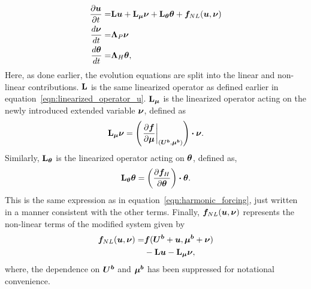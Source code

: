 \begin{subequations}
	\begin{align}
			\label{eqn:evolution_extended1}
			\frac{\partial \boldsymbol{u}}{\partial t} =& \mathbf{L}\boldsymbol{u} + \mathbf{L}_{\boldsymbol{\mu}}\boldsymbol{\nu} +\mathbf{L}_{\boldsymbol{\theta}}\boldsymbol{\theta} + \boldsymbol{f}_{NL}(\boldsymbol{u},\boldsymbol{\nu}) \\
			\label{eqn:evolution_extended2}
			\frac{d \boldsymbol{\nu}}{d t} = & \mathbf{\Lambda}_{P}\boldsymbol{\nu} \\
			\label{eqn:evolution_extended3}
			\frac{d \boldsymbol{\theta}}{d t} = &  \mathbf{\Lambda}_{H}\boldsymbol{\theta}, 
	\end{align}
	\label{eqn:evolution_extended}
\end{subequations}
Here, as done earlier, the evolution equations are split into the linear and non-linear contributions. $\mathbf{L}$ is the same linearized operator as defined earlier in equation~\ref{eqn:linearized_operator_u}. $\mathbf{L}_{\boldsymbol{\mu}}$ is the linearized operator acting on the newly introduced extended variable $\boldsymbol{\nu}$, defined as
\begin{equation}
	\mathbf{L}_{\boldsymbol{\mu}}\boldsymbol{\nu} = \left(\left.\frac{\partial \boldsymbol{f}}{\partial \boldsymbol{\mu}}\right|_{(\boldsymbol{U^{b}},\boldsymbol{\mu^{b}})} \right)\boldsymbol{\cdot} \boldsymbol{\nu}.
	\label{eqn:linearized_operator_mu}
\end{equation}
Similarly, $\mathbf{L}_{\boldsymbol{\theta}}$ is the linearized operator acting on $\boldsymbol{\theta}$, defined as,
\begin{equation}
	\mathbf{L}_{\boldsymbol{\theta}}\boldsymbol{\theta} = \left(\frac{\partial \boldsymbol{f}_{H}}{\partial \boldsymbol{\theta}} \right)\boldsymbol{\cdot} \boldsymbol{\theta}.
	\label{eqn:linearized_operator_theta}
\end{equation}
This is the same expression as in equation~\eqref{eqn:harmonic_forcing}, just written in a manner consistent with the other terms. Finally, $\boldsymbol{f}_{NL}(\boldsymbol{u},\boldsymbol{\nu})$ represents the non-linear terms of the modified system given by
\begin{equation}
	\begin{split}
		\boldsymbol{f}_{NL}(\boldsymbol{u},\boldsymbol{\nu}) =& \boldsymbol{f}(\boldsymbol{U^{b}} + \boldsymbol{u},\boldsymbol{\mu^{b}} + \boldsymbol{\nu}) \\
		& - \mathbf{L}\boldsymbol{u} - \mathbf{L}_{\boldsymbol{\mu}}\boldsymbol{\nu},
	\end{split}
	\label{eqn:nonlinear_term}
\end{equation}
where, the dependence on $\boldsymbol{U^{b}}$ and $\boldsymbol{\mu^{b}}$ has been suppressed for notational convenience. 


